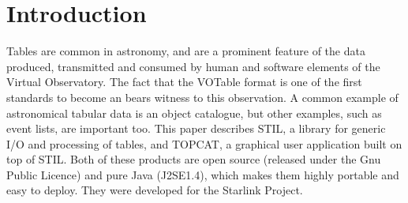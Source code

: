 \documentclass[11pt,twoside]{article}  %
\begin{document}
%
%

\section{Introduction}

Tables are common in astronomy, and are a
prominent feature of the data produced, transmitted and consumed by
human and software elements of the Virtual Observatory.
The fact that the VOTable format is one of the first standards to become an 
bears witness to this observation.
A common example of astronomical tabular data is an object catalogue, 
but other examples, such as event lists, are important too.
This paper describes STIL, a library for generic I/O and processing of
tables, and TOPCAT, a graphical user application built on top of STIL.
Both of these products are open source 
(released under the Gnu Public Licence) and pure Java (J2SE1.4),
which makes them highly portable and easy to deploy.
They were developed for the Starlink Project.
\end{document}
